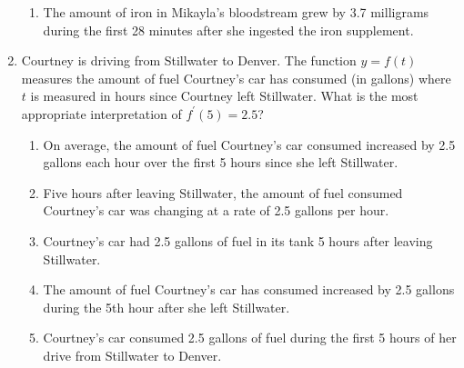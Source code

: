 \documentclass[12pt]{report}
\begin{document}
\begin{enumerate}
\begin{enumerate}
\item The amount of iron in Mikayla's bloodstream grew by 3.7 milligrams during the first 28 minutes after she ingested the iron supplement.
\end{enumerate}

\item Courtney is driving from Stillwater to Denver. The function $y = f(t)$ measures the amount of fuel Courtney's car has consumed (in gallons) where $t$ is measured in hours since Courtney left Stillwater. What is the most appropriate interpretation of $f^\prime (5) = 2.5$?

\begin{enumerate}

\item On average, the amount of fuel Courtney's car consumed increased by 2.5 gallons each hour over the first 5 hours since she left Stillwater.

\item Five hours after leaving Stillwater, the amount of fuel consumed Courtney's car was changing at a rate of 2.5 gallons per hour.

\item Courtney's car had 2.5 gallons of fuel in its tank 5 hours after leaving Stillwater.

\item The amount of fuel Courtney's car has consumed increased by 2.5 gallons during the 5th hour after she left Stillwater.

\item Courtney's car consumed 2.5 gallons of fuel during the first 5 hours of her drive from Stillwater to Denver.

\end{enumerate}



\end{enumerate}
\end{document}
